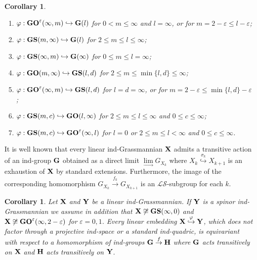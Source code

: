 \documentclass[12pt]{amsart}
\def\eps {\varepsilon}
\def\hw  {\hookrightarrow}
\def\mc {\mathcal}
\newtheorem{coro}[theorem]{Corollary}
\begin{document}
\begin{coro}
\begin{enumerate}
\item[$\bullet$] $\varphi:{\bf GO}^\varepsilon(\infty,m)\hookrightarrow {\bf G}(l)$ for $0<m\leq \infty$ and $l=\infty$, or for $m=2-\eps \leq l-\eps$;\\

\item[$\bullet$] $\varphi:{\bf GS}(m,\infty)\hookrightarrow {\bf G}(l)$ for $2\leq m\leq l\leq\infty$;\\

\item[$\bullet$] $\varphi:{\bf GS}(\infty,m)\hookrightarrow {\bf G}(\infty)$ for $0\leq m\leq l=\infty$;\\

\item[$\bullet$] $\varphi:{\bf GO}(m,\infty)\hookrightarrow {\bf GS}(l,d)$ for $2\leq m\leq \min\{l,d\}\leq \infty$;\\

\item[$\bullet$] $\varphi:{\bf GO}^\eps(\infty,m)\hookrightarrow {\bf GS}(l,d)$ for $l=d=\infty$, or for $m=2-\eps\leq \min\{l,d\}-\eps$;\\

\item[$\bullet$] $\varphi:{\bf GS}(m,c)\hookrightarrow {\bf GO}(l,\infty)$ for $2\leq m\leq l\leq \infty$ and $0\leq c\leq\infty$;\\

\item[$\bullet$] $\varphi:{\bf GS}(m,c)\hookrightarrow {\bf GO}^\eps(\infty,l)$ for $l=0$ or $2\leq m\leq l<\infty$ and $0\leq c\leq\infty$.
\end{enumerate}
\end{coro}


It is well known \cite{Dimitrov-Penkov} that every linear ind-Grassmannian ${\bf X}$ admits a transitive action of an ind-group ${\bf G}$ obtained as a direct limit $\lim\limits_{\to} G_{X_k}$ where $X_k\stackrel{\sigma_k}{\hw} X_{k+1}$ is an exhaustion of ${\bf X}$ by standard extensions. Furthermore, the image of the corresponding homomorphism $G_{X_k}\stackrel{f_k}{\to} G_{X_{k+1}}$ is an $\mc{LS}$-subgroup for each $k$.

\begin{coro}\label{Theo ind-Equivar}
Let ${\bf X}$ and ${\bf Y}$ be a linear ind-Grassmannian. If ${\bf Y}$ is a spinor ind-Grassmannian we assume in addition that ${\bf X}\not\cong {\bf GS}(\infty,0)$ and ${\bf X}\not\cong {\bf GO}^\eps(\infty,2-\eps)$ for $\eps=0,1$. Every linear embedding ${\bf X}\stackrel{\varphi}{\hw}{\bf Y}$, which does not factor through a projective ind-space or a standard ind-quadric, is equivariant with respect to a homomorphism of ind-groups ${\bf G}\stackrel{f}{\to} {\bf H}$ where ${\bf G}$ acts transitively on ${\bf X}$ and ${\bf H}$ acts transitively on ${\bf Y}$.
\end{coro}
\end{document}
